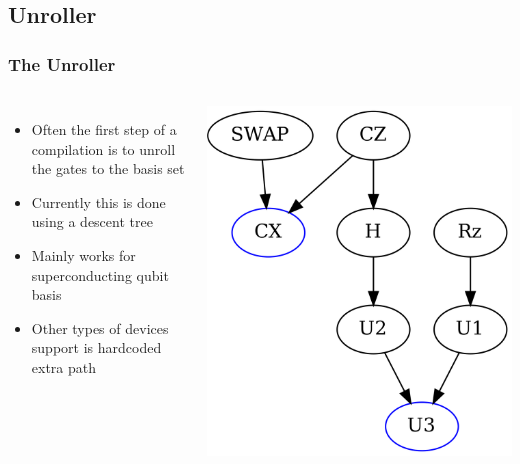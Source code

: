 \documentclass[aspectratio=169,11pt,hyperref={colorlinks=true}]{beamer}
\begin{document}
\subsection{Unroller}
\begin{frame}
    \frametitle{The Unroller}
    \begin{columns}
        \begin{itemize}
            \item Often the first step of a compilation is to unroll the
                gates to the basis set
            \item Currently this is done using a descent tree
            \item Mainly works for superconducting qubit basis
            \item Other types of devices support is hardcoded extra path
        \end{itemize}
            \includegraphics[width=\textwidth]{unroll_descent.png}
    \end{columns}
\end{frame}
\end{document}
